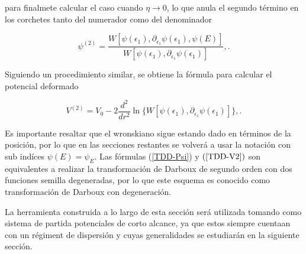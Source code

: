 para finalmete calcular el caso cuando $\eta \to 0$, lo que anula el segundo término en los corchetes tanto del numerador como del denominador

\begin{equation}
\psi^{(2)} = \frac{W[\psi(\epsilon_1), \partial_{\epsilon_1} \psi(\epsilon_1),\psi(E)]}{W[\psi(\epsilon_1), \partial_{\epsilon_1} \psi(\epsilon_1)]}, \label{TDD-Psi}.
\end{equation}

Siguiendo un procedimiento similar, se obtiene la fórmula para calcular el potencial deformado

\begin{equation}
V^{(2)} = V_0 - 2 \frac{d^2}{dr^2}\ln\{W[\psi(\epsilon_1), \partial_{\epsilon_1} \psi(\epsilon_1)]\}, \label{TDD-V2}.
\end{equation}

Es importante resaltar que el wronskiano sigue estando dado en términos de la posición, por lo que en las secciones restantes se volverá a usar la notación con sub indíces $\psi(E) = \psi_E$. Las fórmulas (\ref{TDD-Psi}) y $(\ref{TDD-V2})$ son equivalentes a realizar la transformación de Darboux de segundo orden con dos funciones semilla degeneradas, por lo que este esquema es conocido como transformación de Darboux con degeneración.

La herramienta construida a lo largo de esta sección será utilizada tomando como sistema de partida potenciales de corto alcance, ya que estos siempre cuentaan con un régiment de dispersión y cuyas generalidades se estudiarán en la siguiente sección.

